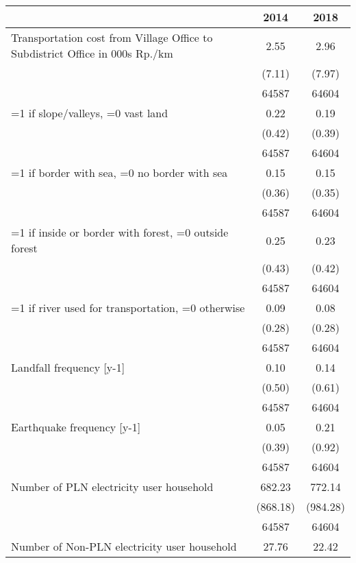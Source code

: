 \begin{tabular}{l*{2}{c}}
\hline\hline
                    &        2014&        2018\\
\hline
Transportation cost from Village Office to Subdistrict Office in 000s Rp./km&        2.55&        2.96\\
                    &      (7.11)&      (7.97)\\
                    &       64587&       64604\\
[1em]
=1 if slope/valleys, =0 vast land&        0.22&        0.19\\
                    &      (0.42)&      (0.39)\\
                    &       64587&       64604\\
[1em]
=1 if border with sea, =0 no border with sea&        0.15&        0.15\\
                    &      (0.36)&      (0.35)\\
                    &       64587&       64604\\
[1em]
=1 if inside or border with forest, =0 outside forest&        0.25&        0.23\\
                    &      (0.43)&      (0.42)\\
                    &       64587&       64604\\
[1em]
=1 if river used for transportation, =0 otherwise&        0.09&        0.08\\
                    &      (0.28)&      (0.28)\\
                    &       64587&       64604\\
[1em]
Landfall frequency [y-1]&        0.10&        0.14\\
                    &      (0.50)&      (0.61)\\
                    &       64587&       64604\\
[1em]
Earthquake frequency [y-1]&        0.05&        0.21\\
                    &      (0.39)&      (0.92)\\
                    &       64587&       64604\\
[1em]
Number of PLN electricity user household&      682.23&      772.14\\
                    &    (868.18)&    (984.28)\\
                    &       64587&       64604\\
[1em]
Number of Non-PLN electricity user household&       27.76&       22.42\\

\end{tabular}
